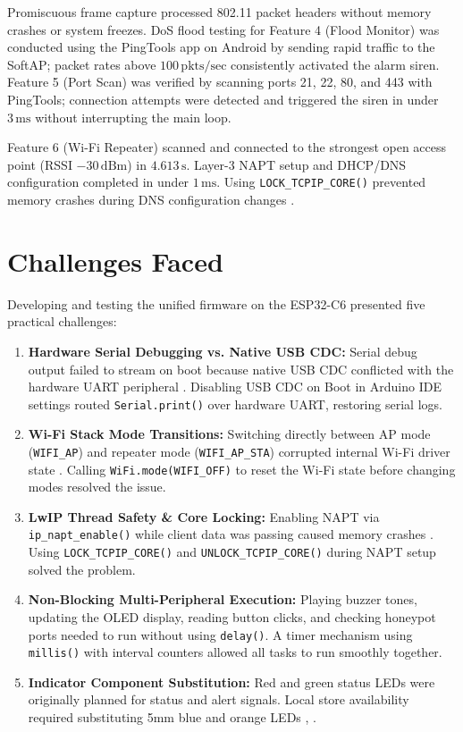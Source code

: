 \documentclass[conference]{IEEEtran}
\begin{document}
Promiscuous frame capture processed 802.11 packet headers \cite{ieee80211} without memory crashes or system freezes. DoS flood testing for Feature 4 (Flood Monitor) was conducted using the PingTools app \cite{pingtools} on Android by sending rapid traffic to the SoftAP; packet rates above $100\,\text{pkts/sec}$ consistently activated the alarm siren. Feature 5 (Port Scan) was verified by scanning ports 21, 22, 80, and 443 with PingTools; connection attempts were detected and triggered the siren in under $3\,\text{ms}$ without interrupting the main loop.

Feature 6 (Wi-Fi Repeater) scanned and connected to the strongest open access point (RSSI $-30\,\text{dBm}$) in $4.613\,\text{s}$. Layer-3 NAPT setup and DHCP/DNS configuration completed in under $1\,\text{ms}$. Using \texttt{LOCK\_TCPIP\_CORE()} prevented memory crashes during DNS configuration changes \cite{lwip}.

\FloatBarrier
\section{Challenges Faced}
Developing and testing the unified firmware on the ESP32-C6 presented five practical challenges:

\begin{enumerate}
    \item \textbf{Hardware Serial Debugging vs. Native USB CDC:} Serial debug output failed to stream on boot because native USB CDC conflicted with the hardware UART peripheral \cite{espressif_idf}. Disabling USB CDC on Boot in Arduino IDE settings routed \texttt{Serial.print()} over hardware UART, restoring serial logs.
    \item \textbf{Wi-Fi Stack Mode Transitions:} Switching directly between AP mode (\texttt{WIFI\_AP}) and repeater mode (\texttt{WIFI\_AP\_STA}) corrupted internal Wi-Fi driver state \cite{espressif_idf}. Calling \texttt{WiFi.mode(WIFI\_OFF)} to reset the Wi-Fi state before changing modes resolved the issue.
    \item \textbf{LwIP Thread Safety \& Core Locking:} Enabling NAPT via \texttt{ip\_napt\_enable()} while client data was passing caused memory crashes \cite{lwip}. Using \texttt{LOCK\_TCPIP\_CORE()} and \texttt{UNLOCK\_TCPIP\_CORE()} during NAPT setup solved the problem.
    \item \textbf{Non-Blocking Multi-Peripheral Execution:} Playing buzzer tones, updating the OLED display, reading button clicks, and checking honeypot ports needed to run without using \texttt{delay()}. A timer mechanism using \texttt{millis()} with interval counters allowed all tasks to run smoothly together.
    \item \textbf{Indicator Component Substitution:} Red and green status LEDs were originally planned for status and alert signals. Local store availability required substituting 5mm blue and orange LEDs \cite{rbd_blue_led}, \cite{rbd_orange_led}.
\end{enumerate}
\end{document}
